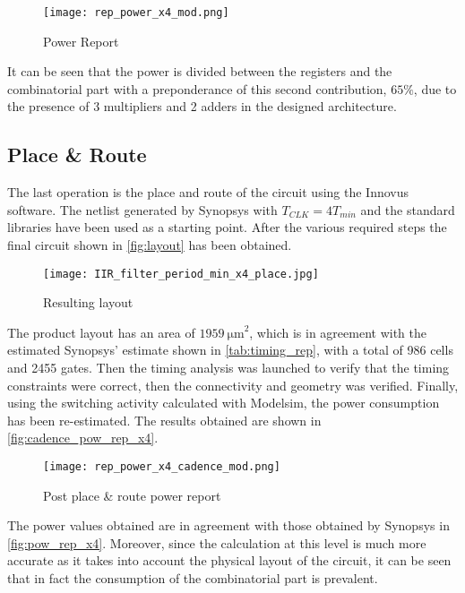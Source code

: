 \begin{figure}[htb!]
	\center
	\texttt{[image: rep\_power\_x4\_mod.png]}
	\caption{Power Report}
	\label{fig:pow_rep_x4}
\end{figure}

It can be seen that the power is divided between the registers and the combinatorial part with a preponderance of this second contribution, $65\%$, due to the presence of 3 multipliers and 2 adders in the designed architecture.

\subsection{Place \& Route}
The last operation is the place and route of the circuit using the Innovus software. The netlist generated by Synopsys with $T_{CLK} = 4 T_{min}$ and the standard libraries have been used as a starting point. After the various required steps the final circuit shown in \autoref{fig:layout} has been obtained.

\begin{figure}[htb!]
	\center
	\texttt{[image: IIR\_filter\_period\_min\_x4\_place.jpg]}
	\caption{Resulting layout}
	\label{fig:layout}
\end{figure}

The product layout has an area of $\SI{1959}{\micro\meter}^2$, which is in agreement with the estimated Synopsys' estimate shown in \autoref{tab:timing_rep}, with a total of 986 cells and 2455 gates. Then the timing analysis was launched to verify that the timing constraints were correct, then the connectivity and geometry was verified. Finally, using the switching activity calculated with Modelsim, the power consumption has been re-estimated. The results obtained are shown in \autoref{fig:cadence_pow_rep_x4}.

\begin{figure}[htb]
	\center
	\texttt{[image: rep\_power\_x4\_cadence\_mod.png]}
	\caption{Post place \& route power report}
	\label{fig:cadence_pow_rep_x4}
\end{figure}

The power values obtained are in agreement with those obtained by Synopsys in \autoref{fig:pow_rep_x4}. Moreover, since the calculation at this level is much more accurate as it takes into account the physical layout of the circuit, it can be seen that in fact the consumption of the combinatorial part is prevalent.